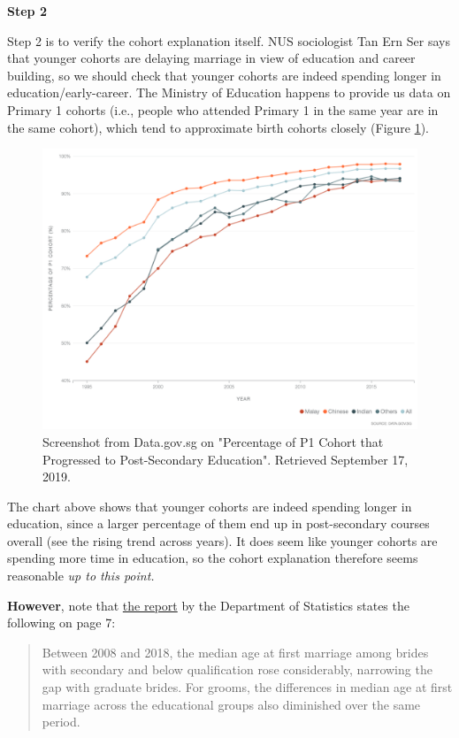 \documentclass[openany]{book}
\begin{document}
\textbf{Step 2}

Step 2 is to verify the cohort explanation itself. NUS sociologist Tan
Ern Ser says that younger cohorts are delaying marriage in view of
education and career building, so we should check that younger cohorts
are indeed spending longer in education/early-career. The Ministry of
Education happens to provide us data on Primary 1 cohorts (i.e., people
who attended Primary 1 in the same year are in the same cohort), which
tend to approximate birth cohorts closely (Figure
\ref{fig:apc-reportmoe}).

\begin{figure}

{\centering \includegraphics[width=0.8\linewidth]{images/apc/apc_moe} 

}

\caption{Screenshot from Data.gov.sg on "Percentage of P1 Cohort that Progressed to Post-Secondary Education". Retrieved September 17, 2019.}\label{fig:apc-reportmoe}
\end{figure}

The chart above shows that younger cohorts are indeed spending longer in
education, since a larger percentage of them end up in post-secondary
courses overall (see the rising trend across years). It does seem like
younger cohorts are spending more time in education, so the cohort
explanation therefore seems reasonable \emph{up to this point.}

\textbf{However}, note that
\href{https://www.singstat.gov.sg/-/media/files/publications/population/smd2018.pdf}{the
report} by the Department of Statistics states the following on page 7:

\begin{quote}
Between 2008 and 2018, the median age at first marriage among brides
with secondary and below qualification rose considerably, narrowing the
gap with graduate brides. For grooms, the differences in median age at
first marriage across the educational groups also diminished over the
same period.
\end{quote}
\end{document}
